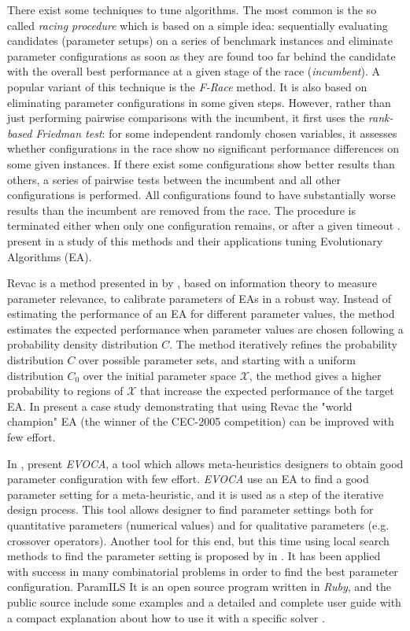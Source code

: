There exist some techniques to tune algorithms. The most common is the so called {\it racing procedure} which is based on a simple idea: sequentially evaluating candidates (parameter setups) on a series of benchmark instances and eliminate parameter configurations as soon as they are found too far behind the candidate with the overall best performance at a given stage of the race (\textit{incumbent}). A popular variant of this technique is the \textit{F-Race} method. It is also based on eliminating parameter configurations in some given steps. However, rather than just performing pairwise comparisons with the incumbent, it first uses the \textit{rank-based Friedman test}: for some independent randomly chosen variables, it assesses whether configurations in the race show no significant performance differences on some given instances. If there exist some configurations show better results than others, a series of pairwise tests between the incumbent and all other configurations is performed. All configurations found to have substantially worse results than the incumbent are removed from the race. The procedure is terminated either when only one configuration remains, or after a given timeout \cite{Hoos2012}.  present in \cite{A.E.Eiben2012} a study of this methods and their applications tuning Evolutionary Algorithms (EA).

{\sc Revac} is a method presented in \cite{Nannen2007} by , based on information theory to measure parameter relevance, to calibrate parameters of EAs in a robust way. Instead of estimating the performance of an EA for different parameter values, the method estimates the expected performance when parameter values are chosen following a probability density distribution $C$. The method iteratively refines the probability distribution $C$ over possible parameter sets, and starting with a uniform distribution $C_0$ over the initial parameter space $\mathcal{X}$, the method gives a higher probability to regions of $\mathcal{X}$ that increase the expected performance of the target EA. In \cite{Smit2010}  present a case study demonstrating that using {\sc Revac} the "world champion" EA (the winner of the CEC-2005 competition) can be improved with few effort.

In \cite{Riff2013},  present \textit{EVOCA}, a tool which allows meta-heuristics designers to obtain good parameter configuration with few effort. \textit{EVOCA} use an EA to find a good parameter setting for a meta-heuristic, and it is used as a step of the iterative design process. This tool allows designer to find parameter settings both for quantitative parameters (numerical values) and for qualitative parameters (e.g. crossover operators). Another tool for this end, but this time using local search methods to find the parameter setting is proposed by  in \cite{Hutter2009}. It has been applied with success in many combinatorial problems in order to find the best parameter configuration. {\sc ParamILS} It is an open source program written in {\it Ruby}, and the public source include some examples and a detailed and complete user guide with a compact explanation about how to use it with a specific solver \cite{Hutter2008}.


